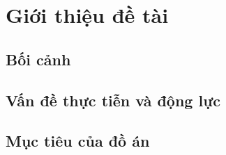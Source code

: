 
\chapter{Giới thiệu đề tài}
\label{ch:gioi-thieu}


\section{Bối cảnh}
\label{sec:boi-canh}

\section{Vấn đề thực tiễn và động lực}
\label{sec:van-de}

\section{Mục tiêu của đồ án}
\label{sec:muc-tieu}

